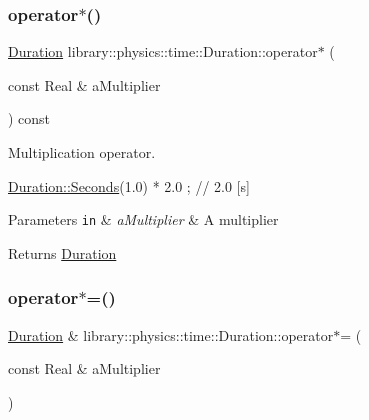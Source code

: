 \subsubsection{\texorpdfstring{operator$\ast$()}{operator*()}}
{\footnotesize\ttfamily \hyperlink{classlibrary_1_1physics_1_1time_1_1_duration}{Duration} library\+::physics\+::time\+::\+Duration\+::operator$\ast$ (\begin{DoxyParamCaption}\item[{const Real \&}]{a\+Multiplier }\end{DoxyParamCaption}) const}



Multiplication operator. 


\begin{DoxyCode}
\hyperlink{classlibrary_1_1physics_1_1time_1_1_duration_ae10891c94a1b2278c444cb44b37132f1}{Duration::Seconds}(1.0) * 2.0 ; \textcolor{comment}{// 2.0 [s]}
\end{DoxyCode}



\begin{DoxyParams}[1]{Parameters}
\mbox{\tt in}  & {\em a\+Multiplier} & A multiplier \\
\hline
\end{DoxyParams}
\begin{DoxyReturn}{Returns}
\hyperlink{classlibrary_1_1physics_1_1time_1_1_duration}{Duration} 
\end{DoxyReturn}
\mbox{\label{classlibrary_1_1physics_1_1time_1_1_duration_a510b18495d52c34ebd34e3bb9bf723e6}} 
\subsubsection{\texorpdfstring{operator$\ast$=()}{operator*=()}}
{\footnotesize\ttfamily \hyperlink{classlibrary_1_1physics_1_1time_1_1_duration}{Duration} \& library\+::physics\+::time\+::\+Duration\+::operator$\ast$= (\begin{DoxyParamCaption}\item[{const Real \&}]{a\+Multiplier }\end{DoxyParamCaption})}



